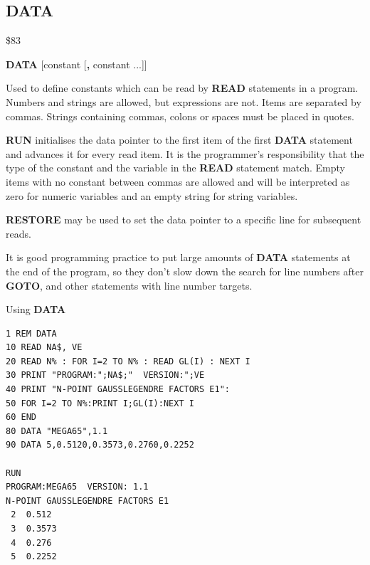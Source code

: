 \subsection{DATA}
\begin{description}[leftmargin=2cm,style=nextline]
\item [Token:] \$83
\item [Format:] {\bf DATA} [constant [{\bf,} constant ...]]
\item [Usage:] Used to define constants
               which can be read by {\bf READ} statements
               in a program. Numbers and strings are allowed, but expressions are not.
               Items are separated by commas.
               Strings containing commas, colons or spaces must be placed
               in quotes.

               {\bf RUN} initialises the data pointer
               to the first item of the first {\bf DATA} statement
               and advances it for every read item. It is the
               programmer's responsibility that the type of
               the constant and the variable in the {\bf READ}
               statement match. Empty items with no constant
               between commas are allowed and will be interpreted as
               zero for numeric variables and an empty string for
               string variables.

               {\bf RESTORE} may be used to set the
               data pointer to a specific line for subsequent
               reads.

\item [Remarks:] It is good programming practice to put large amounts of
               {\bf DATA} statements at the end of the program,
               so they don't slow down the search for line numbers
               after {\bf GOTO}, and other statements with line number targets.
\item [Example:] Using {\bf DATA}
\begin{tcolorbox}[colback=black,coltext=white]
\verbatimfont{\codefont}
\begin{verbatim}
1 REM DATA
10 READ NA$, VE
20 READ N% : FOR I=2 TO N% : READ GL(I) : NEXT I
30 PRINT "PROGRAM:";NA$;"  VERSION:";VE
40 PRINT "N-POINT GAUSSLEGENDRE FACTORS E1":
50 FOR I=2 TO N%:PRINT I;GL(I):NEXT I
60 END
80 DATA "MEGA65",1.1
90 DATA 5,0.5120,0.3573,0.2760,0.2252

RUN
PROGRAM:MEGA65  VERSION: 1.1
N-POINT GAUSSLEGENDRE FACTORS E1
 2  0.512
 3  0.3573
 4  0.276
 5  0.2252
\end{verbatim}
\end{tcolorbox}
\end{description}

